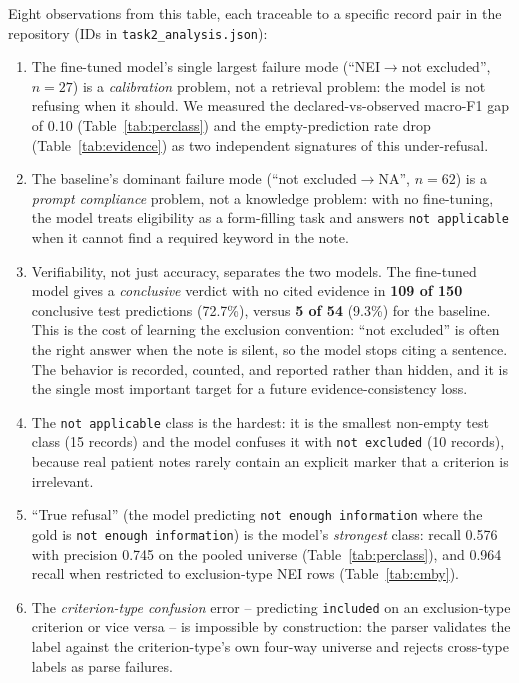 \documentclass[conference]{IEEEtran}
\newcommand{\code}[1]{\texttt{\small #1}}
\begin{document}
Eight observations from this table, each traceable to a specific
record pair in the repository (IDs in \code{task2\_analysis.json}):
\begin{enumerate}[leftmargin=*, itemsep=1pt, topsep=2pt]
\item The fine-tuned model's single largest failure mode
(``NEI$\to$not excluded'', $n=27$) is a
\emph{calibration} problem, not a retrieval problem: the model is
not refusing when it should. We measured the
declared-vs-observed macro-F1 gap of 0.10 (Table~\ref{tab:perclass})
and the empty-prediction rate drop (Table~\ref{tab:evidence})
as two independent signatures of this under-refusal.
\item The baseline's dominant failure mode
(``not excluded$\to$NA'', $n=62$) is a \emph{prompt compliance}
problem, not a knowledge problem: with no fine-tuning, the
model treats eligibility as a form-filling task and answers
\code{not applicable} when it cannot find a required keyword
in the note.
\item Verifiability, not just accuracy, separates the two models.
The fine-tuned model gives a \emph{conclusive} verdict with no
cited evidence in \textbf{109 of 150} conclusive test predictions
(72.7\%), versus \textbf{5 of 54} (9.3\%) for the baseline. This is
the cost of learning the exclusion convention: ``not excluded'' is
often the right answer when the note is silent, so the model stops
citing a sentence. The behavior is recorded, counted, and reported
rather than hidden, and it is the single most important target for
a future evidence-consistency loss.
\item The \code{not applicable} class is the hardest: it is the
smallest non-empty test class (15 records) and the model
confuses it with \code{not excluded} (10 records), because
real patient notes rarely contain an explicit marker that a
criterion is irrelevant.
\item ``True refusal'' (the model predicting \code{not enough
information} where the gold is \code{not enough information})
is the model's \emph{strongest} class: recall 0.576 with
precision 0.745 on the pooled universe (Table~\ref{tab:perclass}),
and 0.964 recall when restricted to exclusion-type NEI rows
(Table~\ref{tab:cmby}).
\item The \emph{criterion-type confusion} error -- predicting
\code{included} on an exclusion-type criterion or vice versa --
is impossible by construction: the parser validates the label
against the criterion-type's own four-way universe and rejects
cross-type labels as parse failures.

\end{enumerate}
\end{document}
